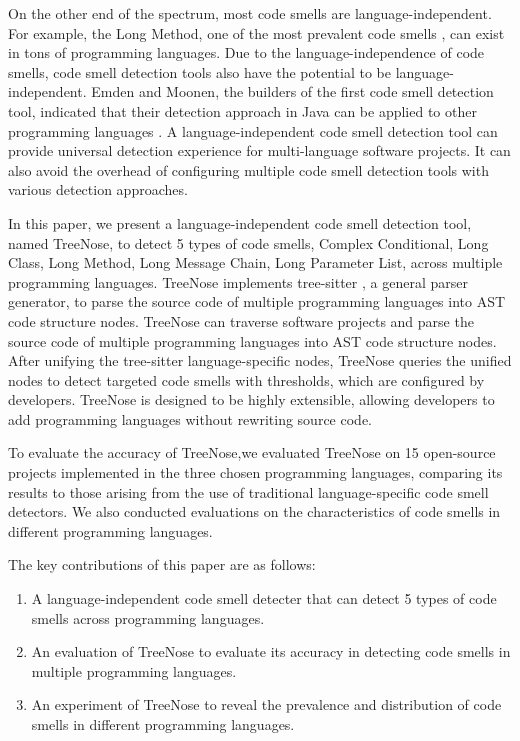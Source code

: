 On the other end of the spectrum, most code smells are language-independent. For example,
the Long Method, one of the most prevalent code smells \cite{developersCare}, can exist in tons of programming languages.
Due to the language-independence of code smells, code smell detection tools also have the potential to be language-independent.
Emden and Moonen, the builders of the first code smell detection tool, indicated that their detection
approach in Java can be applied to other programming languages \cite{1173068}. A language-independent code smell detection tool can
provide universal detection experience for multi-language software projects. It can also avoid the overhead 
of configuring multiple code smell detection tools with various detection approaches.

In this paper, we present a language-independent code smell detection tool, named TreeNose, to detect 5 types of code smells, Complex Conditional, 
Long Class, Long Method, Long Message Chain, Long Parameter List, across multiple programming languages.
TreeNose implements tree-sitter \cite{treeSitter}, a general parser generator,
to parse the source code of multiple programming languages into AST code structure nodes.
TreeNose can traverse software projects and parse the source code of multiple programming languages 
into AST code structure nodes. After unifying the tree-sitter language-specific nodes,
TreeNose queries the unified nodes to detect targeted code smells with thresholds, which are configured by developers.
TreeNose is designed to be highly extensible, allowing developers to add programming languages without rewriting source code.
  
To evaluate the accuracy of TreeNose,we evaluated TreeNose on 15 open-source projects
implemented in the three chosen programming languages, comparing
its results to those arising from the use of traditional language-specific
code smell detectors. We also conducted evaluations on the characteristics 
of code smells in different programming languages. 

The key contributions of this paper are as follows:

\begin{enumerate}
    \item A language-independent code smell detecter that can detect 5 types of code smells across programming languages.
    \item An evaluation of TreeNose to evaluate its accuracy in detecting code smells in multiple programming languages.
    \item An experiment of TreeNose to reveal the prevalence and distribution of code smells in different programming languages.
\end{enumerate}